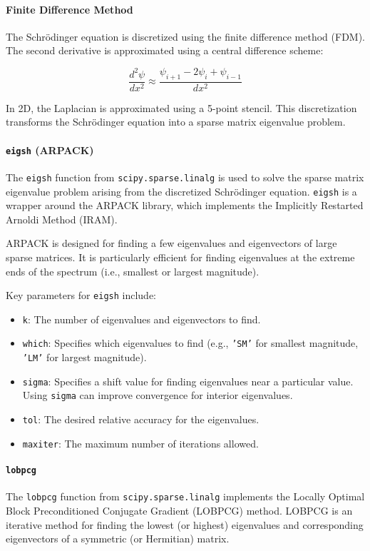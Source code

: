 \documentclass{article}
\begin{document}
\paragraph{Finite Difference Method}
The Schrödinger equation is discretized using the finite difference method (FDM). The second derivative is approximated using a central difference scheme:

\[
\frac{d^2\psi}{dx^2} \approx \frac{\psi_{i+1} - 2\psi_i + \psi_{i-1}}{dx^2}
\]

In 2D, the Laplacian is approximated using a 5-point stencil. This discretization transforms the Schrödinger equation into a sparse matrix eigenvalue problem.

\paragraph{\texttt{eigsh} (ARPACK)}
The \texttt{eigsh} function from \texttt{scipy.sparse.linalg} is used to solve the sparse matrix eigenvalue problem arising from the discretized Schrödinger equation. \texttt{eigsh} is a wrapper around the ARPACK library, which implements the Implicitly Restarted Arnoldi Method (IRAM).

ARPACK is designed for finding a few eigenvalues and eigenvectors of large sparse matrices. It is particularly efficient for finding eigenvalues at the extreme ends of the spectrum (i.e., smallest or largest magnitude).

Key parameters for \texttt{eigsh} include:
\begin{itemize}
    \item \texttt{k}: The number of eigenvalues and eigenvectors to find.
    \item \texttt{which}: Specifies which eigenvalues to find (e.g., \texttt{'SM'} for smallest magnitude, \texttt{'LM'} for largest magnitude).
    \item \texttt{sigma}: Specifies a shift value for finding eigenvalues near a particular value. Using \texttt{sigma} can improve convergence for interior eigenvalues.
    \item \texttt{tol}: The desired relative accuracy for the eigenvalues.
    \item \texttt{maxiter}: The maximum number of iterations allowed.
\end{itemize}

\paragraph{\texttt{lobpcg}}
The \texttt{lobpcg} function from \texttt{scipy.sparse.linalg} implements the Locally Optimal Block Preconditioned Conjugate Gradient (LOBPCG) method. LOBPCG is an iterative method for finding the lowest (or highest) eigenvalues and corresponding eigenvectors of a symmetric (or Hermitian) matrix.
\end{document}

